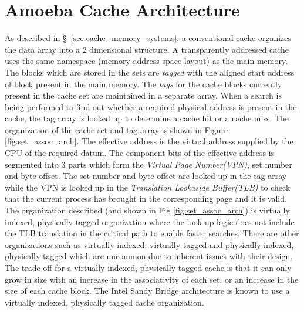 %
%

\chapter{Amoeba Cache Architecture}
\label{chap:ac_architecture}

As described in \S~\ref{sec:cache_memory_systems}, a conventional cache organizes the data array into a 2 dimensional structure. A transparently addressed cache uses the same namespace (memory address space layout) as the main memory. The blocks which are stored in the sets are \textit{tagged} with the aligned start address of block present in the main memory. The \textit{tags} for the cache blocks currently present in the cache set are maintained in a separate array. When a search is being performed to find out whether a required physical address is present in the cache, the tag array is looked up to determine a cache hit or a cache miss. The organization of the cache set and tag array is shown in Figure \ref{fig:set_assoc_arch}. The effective address is the virtual address supplied by the CPU of the required datum. The component bits of the effective address is segmented into 3 parts which form the \textit{Virtual Page Number(VPN)}, set number and byte offset. The set number and byte offset are looked up in the tag array while the VPN is looked up in the \textit{Translation Lookaside Buffer(TLB)} to check that the current process has brought in the corresponding page and it is valid. The organization described (and shown in Fig \ref{fig:set_assoc_arch}) is virtually indexed, physically tagged organization where the look-up logic does not include the TLB translation in the critical path to enable faster searches. There are other organizations such as virtually indexed, virtually tagged and physically indexed, physically tagged which are uncommon due to inherent issues with their design. The trade-off for a virtually indexed, physically tagged cache is that it can only grow in size with an increase in the associativity of each set, or an increase in the size of each cache block. The Intel Sandy Bridge architecture is known to use a virtually indexed, physically tagged cache organization.



